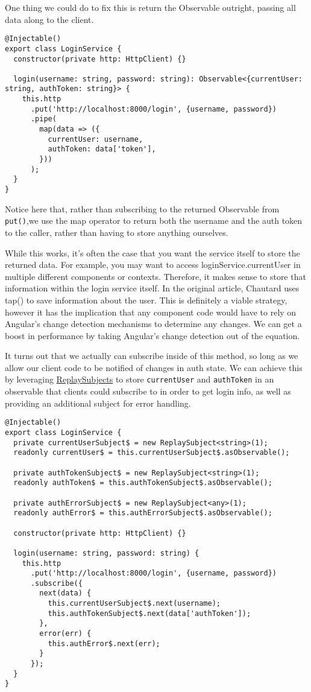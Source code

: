 One thing we could do to fix this is return the Observable outright, passing all data along to the client.

\begin{lstlisting}
@Injectable()
export class LoginService {
  constructor(private http: HttpClient) {}

  login(username: string, password: string): Observable<{currentUser: string, authToken: string}> {
    this.http
      .put('http://localhost:8000/login', {username, password})
      .pipe(
        map(data => ({
          currentUser: username,
          authToken: data['token'],
        }))
      );
  }
}  
\end{lstlisting}

Notice here that, rather than subscribing to the returned Observable from \lstinline{put()},we use the map operator to return both the username and the auth token to the caller, rather than having to store anything ourselves.

While this works, it’s often the case that you want the service itself to store the returned data. For example, you may want to access loginService.currentUser in multiple different components or contexts. Therefore, it makes sense to store that information within the login service itself. In the original article, Chautard uses tap() to save information about the user. This is definitely a viable strategy, however it has the implication that any component code would have to rely on Angular’s change detection mechanisms to determine any changes. We can get a boost in performance by taking Angular’s change detection out of the equation.

It turns out that we actually can subscribe inside of this method, so long as we allow our client code to be notified of changes in auth state. We can achieve this by leveraging \href{https://rxjs-dev.firebaseapp.com/api/index/class/ReplaySubject}{ReplaySubjects} to store \lstinline{currentUser} and \lstinline{authToken} in an observable that clients could subscribe to in order to get login info, as well as providing an additional subject for error handling.

\begin{lstlisting}
@Injectable()
export class LoginService {
  private currentUserSubject$ = new ReplaySubject<string>(1);
  readonly currentUser$ = this.currentUserSubject$.asObservable();

  private authTokenSubject$ = new ReplaySubject<string>(1);
  readonly authToken$ = this.authTokenSubject$.asObservable();

  private authErrorSubject$ = new ReplaySubject<any>(1);
  readonly authError$ = this.authErrorSubject$.asObservable();

  constructor(private http: HttpClient) {}

  login(username: string, password: string) {
    this.http
      .put('http://localhost:8000/login', {username, password})
      .subscribe({
        next(data) {
          this.currentUserSubject$.next(username);
          this.authTokenSubject$.next(data['authToken']);
        },
        error(err) {
          this.authError$.next(err);
        }
      });
  }
}  
\end{lstlisting}

